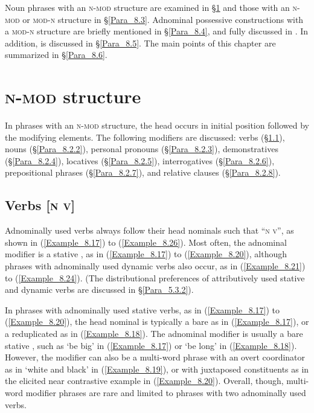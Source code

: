 Noun phrases with an \textsc{n-mod} structure are examined in §\ref{Para_8.2} and those with an \textsc{n-mod} or \textsc{mod-n} structure in §\ref{Para_8.3}. Adnominal possessive constructions with a \textsc{mod-n} structure are briefly mentioned in §\ref{Para_8.4}, and fully discussed in . In addition,  is discussed in §\ref{Para_8.5}. The main points of this chapter are summarized in §\ref{Para_8.6}.


\section[{\footnotesize N-MOD} structure]{\textsc{n-mod} structure}
\label{Para_8.2}
In  phrases with an \textsc{n-mod} structure, the head occurs in initial position followed by the modifying elements. The following modifiers are discussed: verbs (§\ref{Para_8.2.1}), nouns (§\ref{Para_8.2.2}), personal pronouns (§\ref{Para_8.2.3}), demonstratives (§\ref{Para_8.2.4}), locatives (§\ref{Para_8.2.5}), interrogatives (§\ref{Para_8.2.6}), prepositional phrases (§\ref{Para_8.2.7}), and relative clauses (§\ref{Para_8.2.8}).


\subsection{Verbs [\textsc{n} \textsc{v}]}
\label{Para_8.2.1}
Adnominally used verbs always follow their head nominals such that ``\textsc{n} \textsc{v}'', as shown in (\ref{Example_8.17}) to (\ref{Example_8.26}). Most often, the adnominal modifier is a stative , as in (\ref{Example_8.17}) to (\ref{Example_8.20}), although  phrases with adnominally used dynamic verbs also occur, as in (\ref{Example_8.21}) to (\ref{Example_8.24}). (The distributional preferences of attributively used stative and dynamic verbs are discussed in §\ref{Para_5.3.2}).



In  phrases with adnominally used stative verbs, as in (\ref{Example_8.17}) to (\ref{Example_8.20}), the head nominal is typically a bare  as in (\ref{Example_8.17}), or a reduplicated  as in (\ref{Example_8.18}). The adnominal modifier is usually a bare stative , such as  ‘be big’ in (\ref{Example_8.17}) or  ‘be long’ in (\ref{Example_8.18}). However, the modifier can also be a multi-word phrase with an overt coordinator as in  ‘white and black’ in (\ref{Example_8.19}), or with juxtaposed constituents as in the elicited near contrastive example in (\ref{Example_8.20}). Overall, though, multi-word modifier phrases are rare and limited to phrases with two adnominally used verbs.



